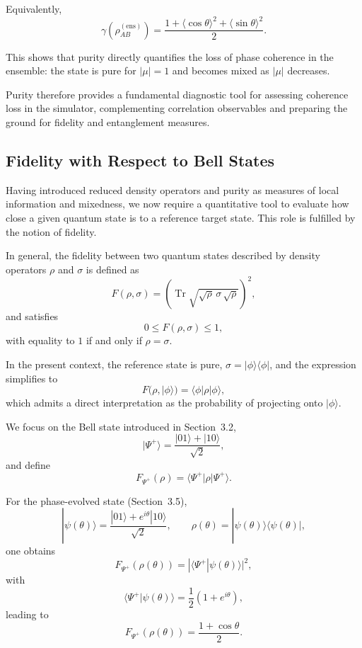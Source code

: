 \documentclass[a4paper]{article}
\begin{document}
Equivalently,
\[
\gamma\!\left(\rho_{AB}^{(\mathrm{ens})}\right)
=
\frac{1 + \langle \cos\theta \rangle^2 + \langle \sin\theta \rangle^2}{2}.
\]

This shows that purity directly quantifies the loss of phase coherence in the ensemble: the state is pure for \( |\mu| = 1 \) and becomes mixed as \( |\mu| \) decreases.

\medskip

Purity therefore provides a fundamental diagnostic tool for assessing coherence loss in the simulator, complementing correlation observables and preparing the ground for fidelity and entanglement measures.


\subsection{Fidelity with Respect to Bell States}

Having introduced reduced density operators and purity as measures of local information and mixedness, we now require a quantitative tool to evaluate how close a given quantum state is to a reference target state. This role is fulfilled by the notion of fidelity.

In general, the fidelity between two quantum states described by density operators \( \rho \) and \( \sigma \) is defined as
\[
F(\rho,\sigma)
=
\left(\operatorname{Tr}\sqrt{\sqrt{\rho}\,\sigma\,\sqrt{\rho}}\right)^2,
\]
and satisfies
\[
0 \le F(\rho,\sigma) \le 1,
\]
with equality to \(1\) if and only if \( \rho = \sigma \).

\medskip

In the present context, the reference state is pure, \( \sigma = |\phi\rangle\langle\phi| \), and the expression simplifies to
\[
F(\rho, |\phi\rangle)
=
\langle \phi | \rho | \phi \rangle,
\]
which admits a direct interpretation as the probability of projecting onto \( |\phi\rangle \).

\medskip

We focus on the Bell state introduced in Section~3.2,
\[
|\Psi^+\rangle = \frac{|01\rangle + |10\rangle}{\sqrt{2}},
\]
and define
\[
F_{\Psi^+}(\rho)
=
\langle \Psi^+ | \rho | \Psi^+ \rangle.
\]

\medskip

For the phase-evolved state (Section~3.5),
\[
|\psi(\theta)\rangle = \frac{|01\rangle + e^{i\theta}|10\rangle}{\sqrt{2}},
\qquad
\rho(\theta) = |\psi(\theta)\rangle\langle\psi(\theta)|,
\]
one obtains
\[
F_{\Psi^+}(\rho(\theta))
=
|\langle \Psi^+ | \psi(\theta) \rangle|^2,
\]
with
\[
\langle \Psi^+ | \psi(\theta) \rangle
=
\frac{1}{2}(1 + e^{i\theta}),
\]
leading to
\[
F_{\Psi^+}(\rho(\theta))
=
\frac{1 + \cos\theta}{2}.
\]
\end{document}
